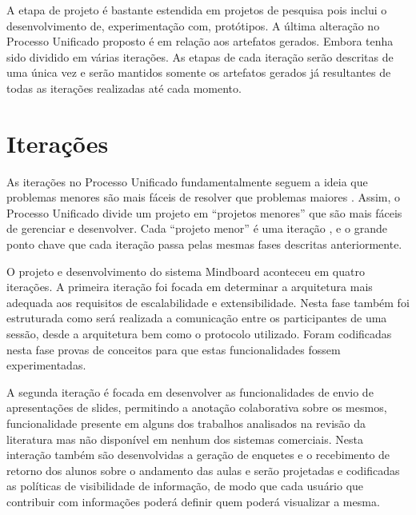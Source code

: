 A etapa de projeto é bastante estendida em projetos de pesquisa pois inclui o desenvolvimento de, experimentação com, protótipos. A última alteração no Processo Unificado proposto é em relação aos artefatos gerados. Embora tenha sido dividido em várias iterações. As etapas de cada iteração serão descritas de uma única vez e serão mantidos somente os artefatos gerados já resultantes de todas as iterações realizadas até cada momento.


\section{Iterações}

As iterações no Processo Unificado fundamentalmente seguem a ideia que problemas menores são mais fáceis de resolver que problemas maiores \cite{arlow:2002}. Assim, o Processo Unificado divide um projeto em ``projetos menores'' que são mais fáceis de gerenciar e desenvolver. Cada ``projeto menor'' é uma iteração \cite{arlow:2002}, e o grande ponto chave que cada iteração passa pelas mesmas fases descritas anteriormente.


O projeto e desenvolvimento do sistema Mindboard aconteceu em quatro iterações. A primeira iteração foi focada em determinar a arquitetura mais adequada aos requisitos de escalabilidade e extensibilidade. Nesta fase também foi estruturada como será realizada a comunicação entre os participantes de uma sessão, desde a arquitetura bem como o protocolo utilizado. Foram codificadas nesta fase provas de conceitos para que estas funcionalidades fossem experimentadas.

A segunda iteração é focada em desenvolver as funcionalidades de envio de apresentações de slides, permitindo a anotação colaborativa sobre os mesmos, funcionalidade presente em alguns dos trabalhos analisados na revisão da literatura mas não disponível em nenhum dos sistemas comerciais. Nesta interação também são desenvolvidas a geração de enquetes e o recebimento de retorno dos alunos sobre o andamento das aulas e serão projetadas e codificadas as políticas de visibilidade de informação, de modo que cada usuário que contribuir com informações poderá definir quem poderá visualizar a mesma.

